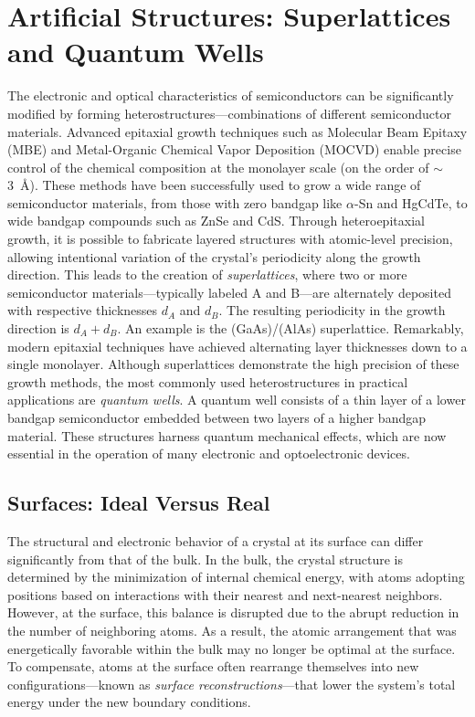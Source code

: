 \section{Artificial Structures: Superlattices and Quantum Wells}
The electronic and optical characteristics of semiconductors can be significantly modified by forming heterostructures—combinations of different semiconductor materials. Advanced epitaxial growth techniques such as Molecular Beam Epitaxy (MBE) and Metal-Organic Chemical Vapor Deposition (MOCVD) enable precise control of the chemical composition at the monolayer scale (on the order of $\sim$3~\AA). These methods have been successfully used to grow a wide range of semiconductor materials, from those with zero bandgap like $\alpha$-Sn and HgCdTe, to wide bandgap compounds such as ZnSe and CdS.
Through heteroepitaxial growth, it is possible to fabricate layered structures with atomic-level precision, allowing intentional variation of the crystal’s periodicity along the growth direction. This leads to the creation of \textit{superlattices}, where two or more semiconductor materials—typically labeled A and B—are alternately deposited with respective thicknesses $d_A$ and $d_B$. The resulting periodicity in the growth direction is $d_A + d_B$. An example is the (GaAs)/(AlAs) superlattice. Remarkably, modern epitaxial techniques have achieved alternating layer thicknesses down to a single monolayer.
Although superlattices demonstrate the high precision of these growth methods, the most commonly used heterostructures in practical applications are \textit{quantum wells}. A quantum well consists of a thin layer of a lower bandgap semiconductor embedded between two layers of a higher bandgap material. These structures harness quantum mechanical effects, which are now essential in the operation of many electronic and optoelectronic devices.

\subsection{Surfaces: Ideal Versus Real}
The structural and electronic behavior of a crystal at its surface can differ significantly from that of the bulk. In the bulk, the crystal structure is determined by the minimization of internal chemical energy, with atoms adopting positions based on interactions with their nearest and next-nearest neighbors. However, at the surface, this balance is disrupted due to the abrupt reduction in the number of neighboring atoms.
As a result, the atomic arrangement that was energetically favorable within the bulk may no longer be optimal at the surface. To compensate, atoms at the surface often rearrange themselves into new configurations—known as \textit{surface reconstructions}—that lower the system’s total energy under the new boundary conditions.

